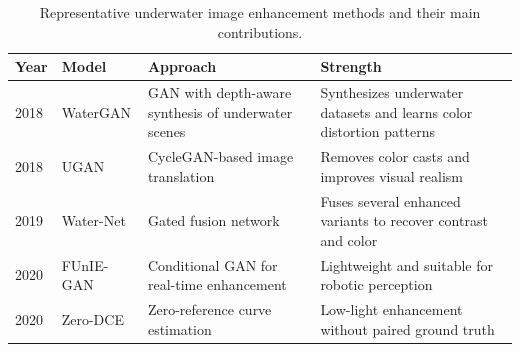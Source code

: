\begin{table}[t]
\centering
\caption{Representative underwater image enhancement methods and their main contributions.}
\label{tab:related_work}
\renewcommand{\arraystretch}{1.25}
\begin{tabular}{p{} p{} p{} p{}}
\toprule
\textbf{Year} & \textbf{Model} & \textbf{Approach} & \textbf{Strength} \\
\midrule
2018 & WaterGAN & GAN with depth-aware synthesis of underwater scenes & Synthesizes underwater datasets and learns color distortion patterns \\
2018 & UGAN & CycleGAN-based image translation & Removes color casts and improves visual realism \\
2019 & Water-Net & Gated fusion network & Fuses several enhanced variants to recover contrast and color \\
2020 & FUnIE-GAN & Conditional GAN for real-time enhancement & Lightweight and suitable for robotic perception \\
2020 & Zero-DCE & Zero-reference curve estimation & Low-light enhancement without paired ground truth \\
\bottomrule
\end{tabular}
\end{table}
